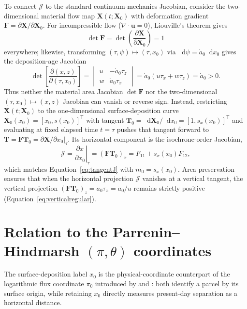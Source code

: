 \documentclass[review]{igs}
\begin{document}
To connect \(\mathcal{J}\) to the standard continuum-mechanics Jacobian, consider the two-dimensional material flow map \(\bm{X}(t;\bm{X}_0)\) with deformation gradient \(\bm{F}=\partial\bm{X}/\partial\bm{X}_0\). For incompressible flow (\(\nabla\cdot\bm{u}=0\)), Liouville's theorem gives
\begin{equation}
\det\bm{F}=\det\!\left(\frac{\partial\bm{X}}{\partial\bm{X}_0}\right)=1
\end{equation}
everywhere; likewise, transforming \((\tau,\psi)\mapsto(\tau,x_0)\) via \(\mathop{}\!\mathrm{d}\psi=\dot a_0\mathop{}\!\mathrm{d} x_0\) gives the deposition-age Jacobian
\begin{equation}
\det\!\left[\frac{\partial(x,z)}{\partial(\tau,x_0)}\right]
=\begin{vmatrix}
u & -\dot a_0\tau_z\\
w & \dot a_0\tau_x
\end{vmatrix}
=\dot a_0\left(u\tau_x+w\tau_z\right)
=\dot a_0>0.
\end{equation}
Thus neither the material area Jacobian \(\det\bm{F}\) nor the two-dimensional \((\tau,x_0)\mapsto(x,z)\) Jacobian can vanish or reverse sign. Instead, restricting \(\bm{X}(t;\bm{X}_0)\) to the one-dimensional surface-deposition curve \(\bm{X}_0(x_0)=[x_0,s(x_0)]^{\mathsf T}\) with tangent \(\bm{T}_0=\mathop{}\!\mathrm{d}\bm{X}_0/\mathop{}\!\mathrm{d} x_0=[1,s_x(x_0)]^{\mathsf T}\) and evaluating at fixed elapsed time \(t=\tau\) pushes that tangent forward to \(\bm{T}=\bm{F}\bm{T}_0=\left.\partial\bm{X}/\partial x_0\right|_{\tau}\). Its horizontal component is the isochrone-order Jacobian,
\begin{equation}
\mathcal{J}
=\left.\frac{\partial x}{\partial x_0}\right|_{\tau}
=(\bm{F}\bm{T}_0)_x
=F_{11}+s_x(x_0)F_{12},
\end{equation}
which matches Equation~\ref{eq:tangentJ} with \(m_0=s_x(x_0)\). Area preservation ensures that when the horizontal projection \(\mathcal{J}\) vanishes at a vertical tangent, the vertical projection \((\bm{F}\bm{T}_0)_z=\dot a_0\tau_x=\dot a_0/u\) remains strictly positive (Equation~\ref{eq:verticalregular}).

\section{Relation to the Parrenin--Hindmarsh \((\pi,\theta)\) coordinates}
\label{app:parrenin}

The surface-deposition label \(x_0\) is the physical-coordinate counterpart of the logarithmic flux coordinate \(\pi_0\) introduced by \citet{ParreninHindmarshRemy2006} and \citet{ParreninHindmarsh2007}: both identify a parcel by its surface origin, while retaining \(x_0\) directly measures present-day separation as a horizontal distance.
\end{document}
